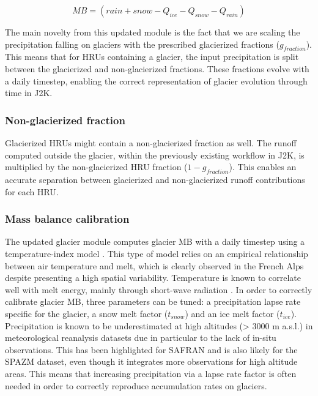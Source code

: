 \begin{equation} \label{hydro:eq:7}
MB = (rain + snow - Q_{ice} - Q_{snow} - Q_{rain}) 
\end{equation} 

The main novelty from this updated module is the fact that we are scaling the precipitation falling on glaciers with the prescribed glacierized fractions ($g_{fraction}$). This means that for HRUs containing a glacier, the input precipitation is split between the glacierized and non-glacierized fractions. These fractions evolve with a daily timestep, enabling the correct representation of glacier evolution through time in J2K. 

\subsubsection{Non-glacierized fraction}

Glacierized HRUs might contain a non-glacierized fraction as well. The runoff computed outside the glacier, within the previously existing workflow in J2K, is multiplied by the non-glacierized HRU fraction ($1 - g_{fraction}$). This enables an accurate separation between glacierized and non-glacierized runoff contributions for each HRU. 

\subsubsection{Mass balance calibration}

The updated glacier module computes glacier MB with a daily timestep using a temperature-index model \citep{hock_temperature_2003}. This type of model relies on an empirical relationship between air temperature and melt, which is clearly observed in the French Alps despite presenting a high spatial variability. Temperature is known to correlate well with melt energy, mainly through short-wave radiation \citep{sicart_glacier_2008}. In order to correctly calibrate glacier MB, three parameters can be tuned: a precipitation lapse rate specific for the glacier, a snow melt factor ($t_{snow}$) and an ice melt factor ($t_{ice}$). Precipitation is known to be underestimated at high altitudes (> 3000 m a.s.l.) in meteorological reanalysis datasets due in particular to the lack of in-situ observations. This has been highlighted for SAFRAN  \citep{vionnet_numerical_2016} and is also likely for the SPAZM dataset, even though it integrates more observations for high altitude areas. This means that increasing precipitation via a lapse rate factor is often needed in order to correctly reproduce accumulation rates on glaciers. 

